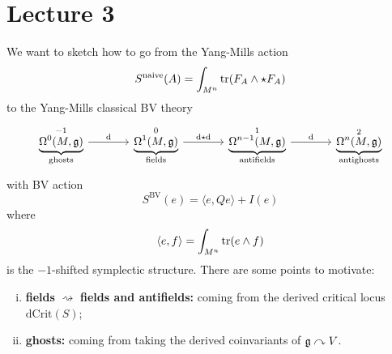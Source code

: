 \chapter{Lecture 3}

We want to sketch how to go from the Yang-Mills action
\begin{equation*}
  S^{\text{naive}} (A) = \int_{M^n} \operatorname{tr} (F_A \wedge \star F_A)
\end{equation*}
to the Yang-Mills classical BV theory
\begin{equation*}
  \begin{tikzcd}[sep=large]
    \underbrace{\Omega^0 (M, \gfrak)}_{\text{ghosts}}^{-1}
    \arrow[r, "\drm"] &
    \underbrace{\Omega^1 (M, \gfrak)}_{\text{fields}}^{0}
    \arrow[r, "\drm \star \drm"] &
    \underbrace{\Omega^{n-1} (M, \gfrak)}_{\text{antifields}}^{1}
    \arrow[r, "\drm"] &
    \underbrace{\Omega^n (M, \gfrak)}_{\text{antighosts}}^{2}
  \end{tikzcd}
\end{equation*}
with BV action
\begin{equation*}
  S^{\text{BV}}(e) = \langle e, Q e \rangle + I(e)
\end{equation*}
where
\begin{equation*}
  \langle e, f \rangle = \int_{M^n} \operatorname{tr} (e \wedge f)
\end{equation*}
is the $-1$-shifted symplectic structure. There are some points to motivate:
\begin{enumerate}[i)]
  \item \textbf{fields} $\rightsquigarrow$ \textbf{fields and antifields:} coming from the derived critical locus $\text{dCrit}(S)$;
  \item \textbf{ghosts:} coming from taking the derived coinvariants of $\mathfrak{g} \curvearrowright V$.
\end{enumerate}

